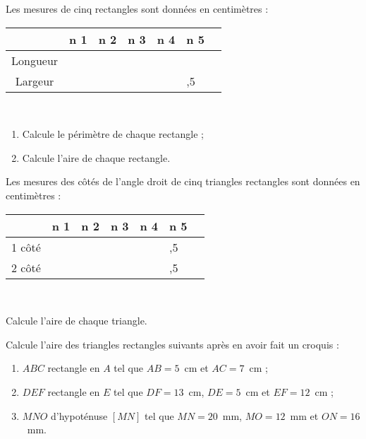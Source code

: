 \begin{exercice}
Les mesures de cinq rectangles sont données en centimètres :

\begin{center}
\begin{tabularx}{\linewidth}{|c|*{6}{>{\centering \arraybackslash}X|}}
\hline  & \cellcolor{J1} n\up{$\circ$} 1 & \cellcolor{J1} n\up{$\circ$} 2 & \cellcolor{J1} n\up{$\circ$} 3 & \cellcolor{J1} n\up{$\circ$} 4 & \cellcolor{J1} n\up{$\circ$} 5 \\
\hline \cellcolor{H1} Longueur & 3 & 5 & 8 & 9 & 8 \\
\hline \cellcolor{H1} Largeur & 2 & 3 & 6 & 7 & 1,5 \\
\hline
\end{tabularx} \\
\end{center}

\begin{enumerate}
 \item Calcule le périmètre de chaque rectangle ;
 \item Calcule l'aire de chaque rectangle.
 \end{enumerate}
\end{exercice}


\begin{exercice}
Les mesures des côtés de l'angle droit de cinq triangles rectangles sont données en centimètres :

\begin{center}
\begin{tabularx}{\linewidth}{|c|*{6}{>{\centering \arraybackslash}X|}}
\hline  & \cellcolor{C1} n\up{$\circ$} 1 & \cellcolor{C1} n\up{$\circ$} 2 & \cellcolor{C1} n\up{$\circ$} 3 & \cellcolor{C1} n\up{$\circ$} 4 & \cellcolor{C1} n\up{$\circ$} 5 \\
\hline \cellcolor{A1} 1\up{er} côté & 3 & 5 & 8 & 9 & 1,5 \\
\hline \cellcolor{A1} 2\up{ème} côté & 4 & 8 & 5 & 7 & 1,5 \\
\hline
\end{tabularx} \\
\end{center}

Calcule l'aire de chaque triangle.
\end{exercice}


\begin{exercice}
Calcule l'aire des triangles rectangles suivants après en avoir fait un croquis :
\begin{enumerate}
 \item $ABC$ rectangle en $A$ tel que $AB = 5$ cm et $AC = 7$ cm ;
 \item $DEF$ rectangle en $E$ tel que $DF = 13$ cm, $DE = 5$ cm et $EF = 12$ cm ;
 \item $MNO$ d'hypoténuse $[MN]$ tel que $MN = 20$ mm, $MO = 12$ mm et $ON = 16$ mm.
 \end{enumerate}
\end{exercice}


